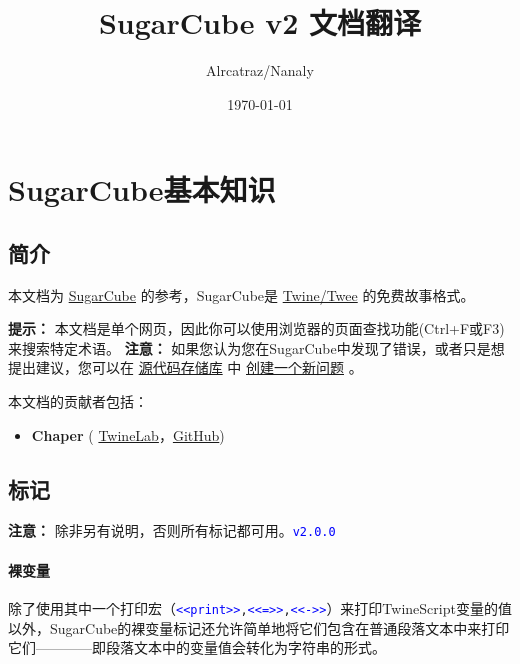 \documentclass[hyperref,UTF8]{ctexart}
\title{SugarCube v2 文档翻译}
\author{Alrcatraz/Nanaly}
\date{\today}
\begin{document}
\maketitle
\newpage
\tableofcontents

\newpage
\section{SugarCube基本知识}
\subsection{简介}
本文档为 \href{http://www.motoslave.net/sugarcube/}{SugarCube} 的参考，SugarCube是 \href{http://twinery.org/}{Twine/Twee} 的免费故事格式。

\textbf{提示：} 本文档是单个网页，因此你可以使用浏览器的页面查找功能(Ctrl+F或F3)来搜索特定术语。
\textbf{注意：} 如果您认为您在SugarCube中发现了错误，或者只是想提出建议，您可以在 \href{https://github.com/tmedwards/sugarcube-2}{源代码存储库} 中 \href{https://github.com/tmedwards/sugarcube-2/issues}{创建一个新问题} 。

本文档的贡献者包括：
\begin{itemize}
    \item \textbf{Chaper} ( \href{https://twinelab.net/}{TwineLab}，\href{https://github.com/ChapelR/}{GitHub})
\end{itemize}

\subsection{标记}
\textbf{注意：} 除非另有说明，否则所有标记都可用。\texttt{\textcolor{blue}{v2.0.0}}
\paragraph{裸变量}

除了使用其中一个打印宏（\texttt{\textcolor{blue}{<<print>>},\textcolor{blue}{<<=>>},\textcolor{blue}{<<->>}}）来打印TwineScript变量的值以外，SugarCube的裸变量标记还允许简单地将它们包含在普通段落文本中来打印它们————即段落文本中的变量值会转化为字符串的形式。
\end{document}

